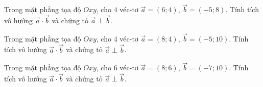 \begin{bt}%
	Trong mặt phẳng tọa độ $Oxy$, cho $4$ véc-tơ $\overrightarrow{a}=(6;4)$, $\overrightarrow{b}=(-5;8)$. Tính tích vô hướng $\overrightarrow{a}\cdot \overrightarrow{b}$ và chứng tỏ $\overrightarrow{a}\perp\overrightarrow{b}$.
\end{bt}

\begin{bt}%
	Trong mặt phẳng tọa độ $Oxy$, cho $4$ véc-tơ $\overrightarrow{a}=(8;4)$, $\overrightarrow{b}=(-5;10)$. Tính tích vô hướng $\overrightarrow{a}\cdot \overrightarrow{b}$ và chứng tỏ $\overrightarrow{a}\perp\overrightarrow{b}$.
\end{bt}

\begin{bt}%
	Trong mặt phẳng tọa độ $Oxy$, cho $6$ véc-tơ $\overrightarrow{a}=(8;6)$, $\overrightarrow{b}=(-7;10)$. Tính tích vô hướng $\overrightarrow{a}\cdot \overrightarrow{b}$ và chứng tỏ $\overrightarrow{a}\perp\overrightarrow{b}$.
\end{bt}
